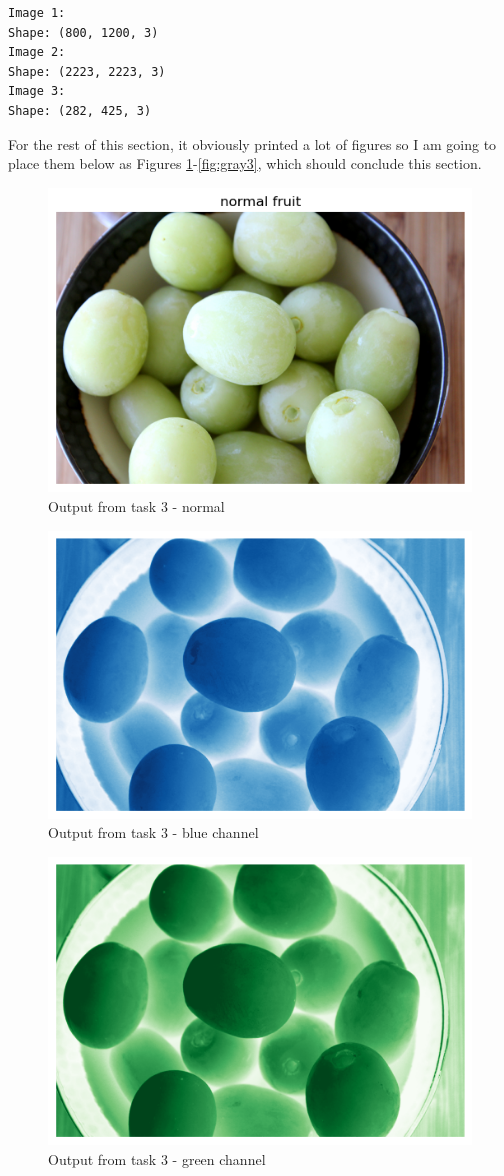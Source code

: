 \documentclass[conference]{IEEEtran} %
\begin{document}
\begin{lstlisting}
Image 1: 
Shape: (800, 1200, 3)
Image 2: 
Shape: (2223, 2223, 3)
Image 3: 
Shape: (282, 425, 3)
\end{lstlisting}
For the rest of this section, it obviously printed a lot of figures so I am going to place them below as Figures \ref{fig:normal1}-\ref{fig:gray3}, which should conclude this section.

\begin{figure}[H]
    \centering
    \includegraphics[width=0.5\linewidth]{Task3Output/normalfruit1.png}
    \caption{Output from task 3 - normal}
    \label{fig:normal1}
\end{figure}

\begin{figure}[H]
    \centering
    \includegraphics[width=0.5\linewidth]{Task3Output/blue1.png}
    \caption{Output from task 3 - blue channel}
    \label{fig:blue1}
\end{figure}

\begin{figure}[H]
    \centering
    \includegraphics[width=0.5\linewidth]{Task3Output/green1.png}
    \caption{Output from task 3 - green channel}
    \label{fig:green1}
\end{figure}
\end{document}

